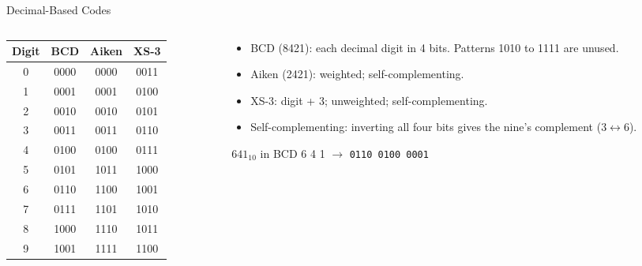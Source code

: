 \documentclass[9pt,aspectratio=169,xcolor=table]{beamer}
\newcommand{\striped}{\rowcolors{1}{white}{stripe}}
\begin{document}
\begin{frame}{Decimal-Based Codes}
  \begin{columns}[c]
  \begin{column}{.45\textwidth}
    \centering\small\striped
    \begin{tabular}{@{}cccc@{}}
      \toprule
      \textbf{Digit} & \textbf{BCD} & \textbf{Aiken} & \textbf{XS-3} \\
      \midrule
      0 & 0000 & 0000 & 0011 \\
      1 & 0001 & 0001 & 0100 \\
      2 & 0010 & 0010 & 0101 \\
      3 & 0011 & 0011 & 0110 \\
      4 & 0100 & 0100 & 0111 \\
      5 & 0101 & 1011 & 1000 \\
      6 & 0110 & 1100 & 1001 \\
      7 & 0111 & 1101 & 1010 \\
      8 & 1000 & 1110 & 1011 \\
      9 & 1001 & 1111 & 1100 \\
      \bottomrule
    \end{tabular}
  \end{column}
  \begin{column}{.53\textwidth}
    \begin{itemize}\small\itemsep2pt
      \item \alert{BCD (8421)}: each decimal digit in 4 bits. Patterns 1010 to 1111 are unused.
      \item \alert{Aiken (2421)}: weighted; self-complementing.
      \item \alert{XS-3}: digit + 3; unweighted; self-complementing.
      \item Self-complementing: inverting all four bits gives the nine's complement ($3 \leftrightarrow 6$).
    \end{itemize}
    \begin{block}{$641_{10}$ in BCD}
      \small 6 4 1 $\to$ \texttt{0110 0100 0001}
    \end{block}
  \end{column}
  \end{columns}
\end{frame}
\end{document}
